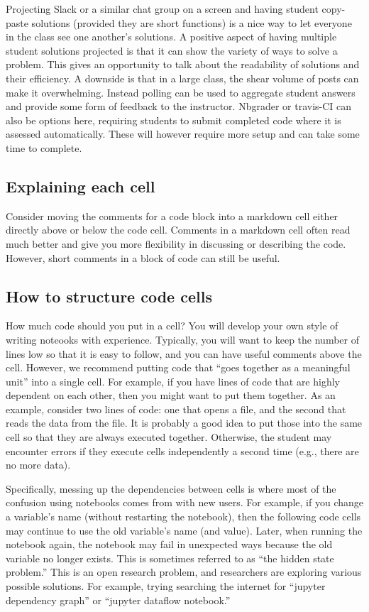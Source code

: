 \documentclass[]{book}
\begin{document}
Projecting Slack or a similar chat group on a screen and having student
copy-paste solutions (provided they are short functions) is a nice way
to let everyone in the class see one another's solutions. A positive
aspect of having multiple student solutions projected is that it can
show the variety of ways to solve a problem. This gives an opportunity
to talk about the readability of solutions and their efficiency. A
downside is that in a large class, the shear volume of posts can make it
overwhelming. Instead polling can be used to aggregate student answers
and provide some form of feedback to the instructor. Nbgrader or
travis-CI can also be options here, requiring students to submit
completed code where it is assessed automatically. These will however
require more setup and can take some time to complete.

\subsection{Explaining each cell}\label{explaining-each-cell}

Consider moving the comments for a code block into a markdown cell
either directly above or below the code cell. Comments in a markdown
cell often read much better and give you more flexibility in discussing
or describing the code. However, short comments in a block of code can
still be useful.

\subsection{How to structure code
cells}\label{how-to-structure-code-cells}

How much code should you put in a cell? You will develop your own style
of writing noteooks with experience. Typically, you will want to keep
the number of lines low so that it is easy to follow, and you can have
useful comments above the cell. However, we recommend putting code that
``goes together as a meaningful unit'' into a single cell. For example,
if you have lines of code that are highly dependent on each other, then
you might want to put them together. As an example, consider two lines
of code: one that opens a file, and the second that reads the data from
the file. It is probably a good idea to put those into the same cell so
that they are always executed together. Otherwise, the student may
encounter errors if they execute cells independently a second time
(e.g., there are no more data).

Specifically, messing up the dependencies between cells is where most of
the confusion using notebooks comes from with new users. For example, if
you change a variable's name (without restarting the notebook), then the
following code cells may continue to use the old variable's name (and
value). Later, when running the notebook again, the notebook may fail in
unexpected ways because the old variable no longer exists. This is
sometimes referred to as ``the hidden state problem.'' This is an open
research problem, and researchers are exploring various possible
solutions. For example, trying searching the internet for ``jupyter
dependency graph'' or ``jupyter dataflow notebook.''
\end{document}
